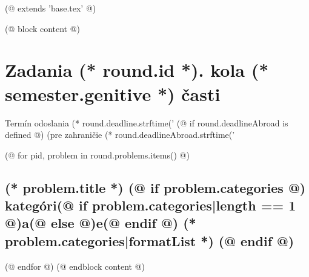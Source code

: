 (@ extends 'base.tex' @)
 
(@ block content @)
    

    \pagestyle{seminar-problems-(* competition.id *)-(* volume.id *)-(* semester.id *)-(* round.id *)}
    \thispagestyle{seminar-first-(* competition.id *)-(* volume.id *)-(* semester.id *)}
    \vspace*{8mm}

    {
        \section{\texorpdfstring{Zadania (* round.id *). kola (* semester.genitive *) časti}{Zadania}}
        \centering
        \vspace*{-5mm}
        Termín odoslania (* round.deadline.strftime('%
        (@ if round.deadlineAbroad is defined @) (pre zahraničie (* round.deadlineAbroad.strftime('%
    } 
        
    (@ for pid, problem in round.problems.items() @)%
        \setcounter{volume}{(* volume.number *)}%
        \setcounter{semester}{(* semester.number *)}%
        \setcounter{round}{(* round.number *)}%
        \setcounter{problem}{(* problem.number *)}%
        
        \subsection{%
            \texorpdfstring{%
                \large \textbf{(* problem.title *)}%
                (@ if problem.categories @)%
                \normalsize \hfill kategóri(@ if problem.categories|length == 1 @)a(@ else @)e(@ endif @) (* problem.categories|formatList *)%
                (@ endif @)
            }{%
                (* round.number *).(* problem.number *) (* problem.title *)%
            }%
        }%
    (@ endfor @)
(@ endblock content @)
